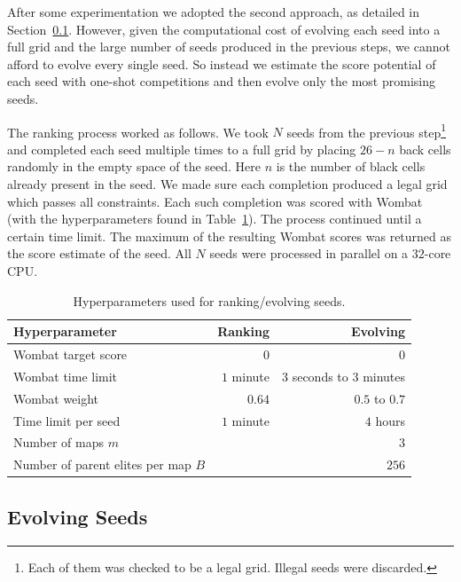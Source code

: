 After some experimentation we adopted the second approach, as detailed in Section~\ref{sec:evolution}. However, given the computational cost of evolving each seed into a full grid and the large number of seeds produced in the previous steps, we cannot afford to evolve every single seed. So instead we estimate the score potential of each seed with one-shot competitions and then evolve only the most promising seeds.

The ranking process worked as follows. We took $N$ seeds from the previous step\footnote{Each of them was checked to be a legal grid. Illegal seeds were discarded.} and completed each seed multiple times to a full grid by placing $26-n$ back cells randomly in the empty space of the seed. Here $n$ is the number of black cells already present in the seed. We made sure each completion produced a legal grid which passes all constraints. Each such completion was scored with {\sc Wombat} (with the hyperparameters found in Table~\ref{tab:hyperparameters}). The process continued until a certain time limit. The maximum of the resulting {\sc Wombat} scores was returned as the score estimate of the seed. All $N$ seeds were processed in parallel on a $32$-core CPU.

\begin{table}[htbp]
\caption{Hyperparameters used for ranking/evolving seeds.}
\label{tab:hyperparameters}
\centering
{ \begin{tabular}{l|r|r}
\toprule
{\bf Hyperparameter} & {\bf Ranking} & {\bf Evolving} \\
\midrule
{\sc Wombat} target score & $0$ & $0$ \\
{\sc Wombat} time limit & $1$ minute & $3$ seconds to $3$ minutes \\
{\sc Wombat} weight & $0.64$ & $0.5$ to $0.7$ \\
Time limit per seed & $1$ minute & $4$ hours \\
Number of maps $m$ & & $3$ \\
Number of parent elites per map $B$ & & $256$ \\
\bottomrule
\end{tabular}}
\end{table}


\subsection{Evolving Seeds}
\label{sec:evolution}

